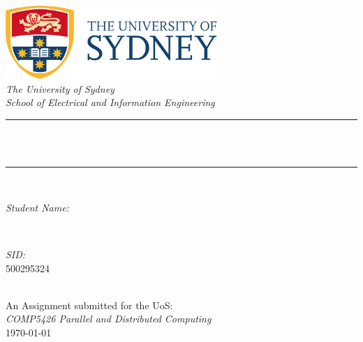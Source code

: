 \begin{titlepage}
    \newcommand{\HRule}{\rule{\linewidth}{0.5mm}}
    \includegraphics[width=8cm]{title/logo.png}
    \center 
    \quad\\[1.5cm]
    \textsl{\Large The University of Sydney}\\[0.5cm] 
    \textsl{\large School of Electrical and Information Engineering}\\[0.5cm] 
    \makeatletter
    \HRule \\[0.4cm]
    { \huge \bfseries \@title}\\[0.4cm] 
    \HRule \\[1.5cm]
    \begin{minipage}{0.4\textwidth}
    \begin{flushleft} \large
    \emph{Student Name:}\\
    \@author 
    \end{flushleft}
    \end{minipage}
    ~
    \begin{minipage}{0.4\textwidth}
    \begin{flushright} \large
    \emph{SID:} \\
    \textup{500295324}
    \end{flushright}
    \end{minipage}\\[3cm]
    \makeatother
    {\large An Assignment submitted for the UoS:}\\[0.5cm]
    {\large \emph{COMP5426 Parallel and Distributed Computing}}\\[0.5cm]
    {\large \today}\\[2cm] 
    \vfill 
\end{titlepage}
